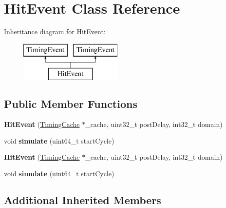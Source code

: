 \hypertarget{classHitEvent}{\section{Hit\-Event Class Reference}
\label{classHitEvent}
}
Inheritance diagram for Hit\-Event\-:\begin{figure}[H]
\begin{center}
\leavevmode
\includegraphics[height=2.000000cm]{classHitEvent}
\end{center}
\end{figure}
\subsection*{Public Member Functions}
\begin{DoxyCompactItemize}
\item 
\hypertarget{classHitEvent_a1a3c3935f5eab43937c515af8d67928d}{{\bfseries Hit\-Event} (\hyperlink{classTimingCache}{Timing\-Cache} $\ast$\-\_\-cache, uint32\-\_\-t post\-Delay, int32\-\_\-t domain)}\label{classHitEvent_a1a3c3935f5eab43937c515af8d67928d}

\item 
\hypertarget{classHitEvent_aa71a04912c1b5df3ae27fb8af88404ae}{void {\bfseries simulate} (uint64\-\_\-t start\-Cycle)}\label{classHitEvent_aa71a04912c1b5df3ae27fb8af88404ae}

\item 
\hypertarget{classHitEvent_a1a3c3935f5eab43937c515af8d67928d}{{\bfseries Hit\-Event} (\hyperlink{classTimingCache}{Timing\-Cache} $\ast$\-\_\-cache, uint32\-\_\-t post\-Delay, int32\-\_\-t domain)}\label{classHitEvent_a1a3c3935f5eab43937c515af8d67928d}

\item 
\hypertarget{classHitEvent_aa71a04912c1b5df3ae27fb8af88404ae}{void {\bfseries simulate} (uint64\-\_\-t start\-Cycle)}\label{classHitEvent_aa71a04912c1b5df3ae27fb8af88404ae}

\end{DoxyCompactItemize}
\subsection*{Additional Inherited Members}


